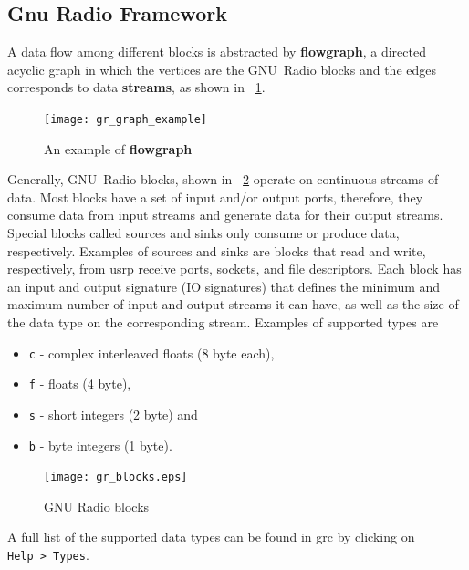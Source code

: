 \subsection{Gnu Radio Framework}
A data flow among different blocks is abstracted by \textbf{flowgraph}, a directed acyclic graph in which the vertices are the GNU~Radio blocks and the edges corresponds to data \textbf{streams}, as shown in ~\cref{flowgraph}. 
%
\begin{figure}[thb]
\centering
\texttt{[image: gr\_graph\_example]}
\caption{An example of \textbf{flowgraph}}\label{flowgraph}
\end{figure}
%
Generally, GNU~Radio blocks, shown in ~\cref{fig:gnuradio_block} operate on continuous streams of data. Most blocks have a set of input and/or output ports, therefore, they consume data from input streams and generate data for their output streams. Special blocks called sources and sinks only consume or produce data, respectively. Examples of sources and sinks are blocks that read and write, respectively, from \gls{usrp} receive ports, sockets, and file descriptors. Each block has an input and output signature (IO signatures) that defines the minimum and maximum number of input and output streams it can have, as well as the size of the data type on the corresponding stream. Examples of supported types are
\begin{itemize}
 \item \texttt{c} - complex interleaved floats (8 byte each),
\item \texttt{f} - floats (4 byte),
\item \texttt{s} - short integers (2 byte) and
\item \texttt{b} - byte integers (1 byte).
\end{itemize}
%
\begin{figure}[thb]
\centering
\texttt{[image: gr\_blocks.eps]}
\caption{GNU Radio blocks}\label{fig:gnuradio_block}
\end{figure}

A full list of the supported data types can be found in \gls{grc} by clicking on \texttt{Help~>~Types}.
%

